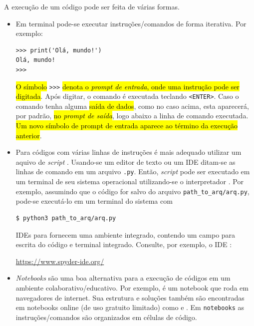 A execução de um código {\python} pode ser feita de várias formas.

\begin{itemize}
\item {}

  Em terminal {\python} pode-se executar instruções/comandos de forma iterativa. Por exemplo:

\begin{lstlisting}[xrightmargin=2.5em]
>>> print('Olá, mundo!')
Olá, mundo!
>>> 
\end{lstlisting}      

  \hl{O símbolo }\lstinline+>>>+\hl{ denota o \emph{prompt de entrada}, onde uma instrução {\python} pode ser digitada}. Após digitar, o comando é executada teclando \texttt{<ENTER>}. Caso o comando tenha alguma \hl{saída de dados}, como no caso acima, esta aparecerá, por padrão, \hl{no \emph{prompt de saída}}, logo abaixo a linha de comando executada. \hl{Um novo símbolo de prompt de entrada aparece ao término da execução anterior}.

\item {}

  Para códigos com várias linhas de instruções é mais adequado utilizar um aquivo de \textit{script} {\python}. Usando-se um editor de texto ou um IDE ditam-se as linhas de comando em um arquivo \texttt{.py}. Então, \textit{script} pode ser executado em um terminal de seu sistema operacional utilizando-se o interpretador {\python}. Por exemplo, assumindo que o código for salvo do arquivo \lstinline{path_to_arq/arq.py}, pode-se executá-lo em um terminal do sistema com

\begin{lstlisting}[xrightmargin=2.5em]
$ python3 path_to_arq/arq.py 
\end{lstlisting}%
  

  IDEs para {\python} fornecem uma ambiente integrado, contendo um campo para escrita do código e terminal {\python} integrado. Consulte, por exemplo, o IDE {\spyder}:
  \begin{center}
    \url{https://www.spyder-ide.org/}
  \end{center}

\item {}

  \textit{Notebooks} {\python} são uma boa alternativa para a execução de códigos em um ambiente colaborativo/educativo. Por exemplo, {\jupyter} é um notebook que roda em navegadores de internet. Sua estrutura e soluções também são encontradas em notebooks online (de uso gratuito limitado) como {\colab} e {\kaggle}. Em \texttt{notebooks} as instruções/comandos são organizados em células de código.


\end{itemize}
